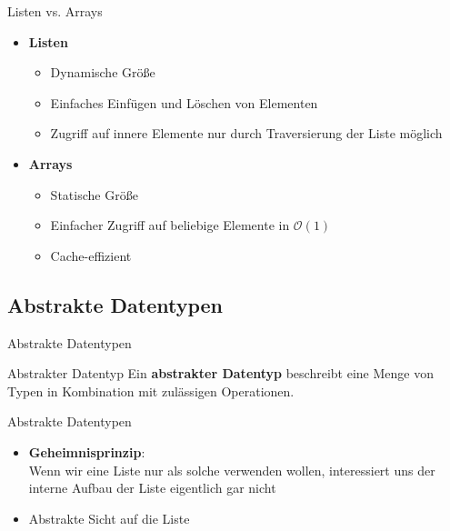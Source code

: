 \documentclass[18pt]{beamer}
\begin{document}
\begin{frame}{Listen vs. Arrays}
    \begin{itemize}
        \item \textbf{Listen}
        \begin{itemize}
            \item Dynamische Größe
            \item Einfaches Einfügen und Löschen von Elementen
            \item Zugriff auf innere Elemente nur durch Traversierung der Liste möglich
        \end{itemize}
        \item \textbf{Arrays}
        \begin{itemize}
            \item Statische Größe
            \item Einfacher Zugriff auf beliebige Elemente in $\mathcal{O}(1)$
            \item Cache-effizient
        \end{itemize}
    \end{itemize}
\end{frame}


\subsection{Abstrakte Datentypen}

\begin{frame}{Abstrakte Datentypen}
    \begin{block}{Abstrakter Datentyp}
        Ein \textbf{abstrakter Datentyp} beschreibt eine Menge von Typen in Kombination mit zulässigen Operationen.
    \end{block}

\end{frame}

\begin{frame}{Abstrakte Datentypen}
    \begin{itemize}
        \item \textbf{Geheimnisprinzip}:\\
        Wenn wir eine Liste nur als solche verwenden wollen,
        interessiert uns der interne Aufbau der Liste eigentlich gar nicht
        \item Abstrakte Sicht auf die Liste
    \end{itemize}

\end{frame}
\end{document}
